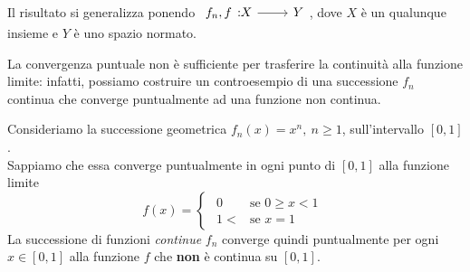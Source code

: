 \begin{digression}
	Il risultato si generalizza ponendo $\funz{f_n,f}{X}{Y}$, dove $X$ è un qualunque insieme e $Y$ è uno spazio normato.
\end{digression}
La convergenza puntuale non è sufficiente per trasferire la continuità alla funzione limite: infatti, possiamo costruire un controesempio di una successione $f_n$ continua che converge puntualmente ad una funzione non continua.
\begin{example}
Consideriamo la successione geometrica $f_n(x)=x^n,\ n\geq1$, sull'intervallo $[0,1]$.\\
Sappiamo che essa converge puntualmente in ogni punto di $[0,1]$ alla funzione limite 
\begin{equation*}
	f\left(x\right)=
	\begin{cases}
		\begin{array}{ll}
			0&\text{se }0\geq x < 1\\
			1<&\text{se }x=1
		\end{array}
	\end{cases}
\end{equation*}
La successione di funzioni \textit{continue} $f_n$ converge quindi puntualmente per ogni $x\in[0,1]$ alla funzione $f$ che \textbf{non} è continua su $[0,1]$.
\end{example}
